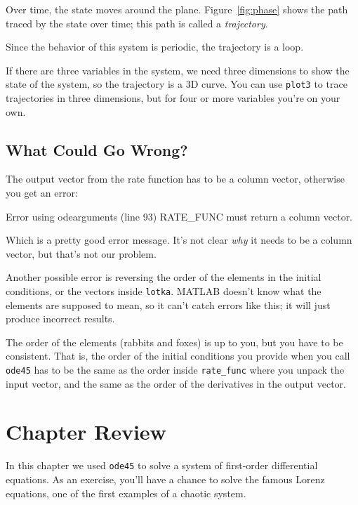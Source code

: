 Over time, the state moves around the plane. Figure~\ref{fig:phase} shows
the path traced by the state over time; this path
is called a {\em trajectory}.

Since the behavior of this system is periodic, the trajectory is a loop.

If there are three variables in the system, we need three dimensions to show
the state of the system, so the trajectory is a 3D curve.
You can use \lstinline{plot3} to trace trajectories in three dimensions,
but for four or more variables you're on your own.



\subsection{What Could Go Wrong?}

The output vector from the rate function has to be a column vector, otherwise you get an error:

\begin{code}
Error using odearguments (line 93)
RATE_FUNC must return a column vector.
\end{code}

Which is a pretty good error message.  It's not clear {\em why}
it needs to be a column vector, but that's not our problem.


Another possible error is reversing the order of the elements in the
initial conditions, or the vectors inside \lstinline{lotka}.  MATLAB
doesn't know what the elements are supposed to mean, so it can't catch
errors like this; it will just produce incorrect results.

The order of the elements (rabbits and foxes) is up to you, but
you have to be consistent.  That is, the order of the initial conditions you
provide when you call \lstinline{ode45} has to be the same as the order
inside \lstinline{rate_func} where you unpack the input vector, and the
same as the order of the derivatives in the output vector.

\section{Chapter Review}

In this chapter we used \lstinline{ode45} to solve a system of first-order differential equations.
As an exercise, you'll have a chance to solve the famous Lorenz equations, one of the first examples of a chaotic system.

